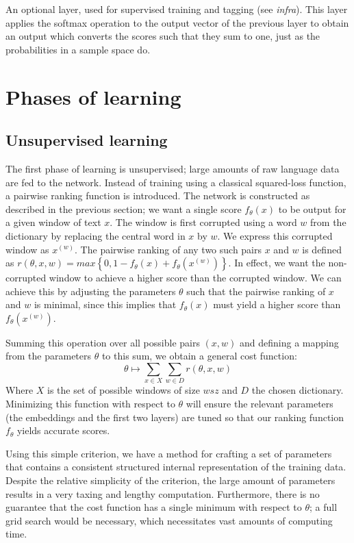 An optional layer, used for supervised training and tagging (see
\textit{infra}). This layer applies the softmax operation
\cite{bridle1990probabilistic} to the output vector of the previous
layer to obtain an output which converts the scores such that they sum
to one, just as the probabilities in a sample space do.


\section{Phases of learning}
\subsection{Unsupervised learning}
\label{sec:unsupervised}

The first phase of learning is unsupervised; large amounts of raw
language data are fed to the network. Instead of training using a
classical squared-loss function, a pairwise ranking function is
introduced. The network is constructed as described in the previous
section; we want a single score $f_{\theta}(x)$ to be output for a
given window of text $x$.  The window is first corrupted using a word
$w$ from the dictionary by replacing the central word in $x$ by
$w$. We express this corrupted window as $x^{(w)}$. The pairwise
ranking of any two such pairs $x$ and $w$ is defined as $r(\theta, x, w) = max\left\{0,
  1 - f_{\theta}(x) + f_{\theta}(x^{(w)})\right\}$. 
In effect, we want the non-corrupted window to achieve a higher score
than the corrupted window. We can achieve this by adjusting the
parameters $\theta$ such that the pairwise ranking of $x$ and $w$ is
minimal, since this implies that $f_{\theta}(x)$ must yield a higher
score than $f_{\theta}(x^{(w)})$.

Summing this operation over all possible pairs $(x, w)$ and defining a
mapping from the parameters $\theta$ to this sum, we obtain a general
cost function:
\begin{equation}
  \theta \mapsto \sum\limits_{x \in X} \sum\limits_{w \in D} r(\theta, x, w)
\end{equation}
Where $X$ is the set of possible windows of size $wsz$ and $D$ the chosen
dictionary. Minimizing this function with respect to $\theta$ will
ensure the relevant parameters (the embeddings and the first two
layers) are tuned so that our ranking function $f_{\theta}$ yields
accurate scores. 

Using this simple criterion, we have a method for crafting a set of
parameters that contains a consistent structured internal
representation of the training data. Despite the relative simplicity
of the criterion, the large amount of parameters results in a very
taxing and lengthy computation. Furthermore, there is no guarantee
that the cost function has a single minimum with respect to $\theta$;
a full grid search would be necessary, which necessitates vast amounts
of computing time.

